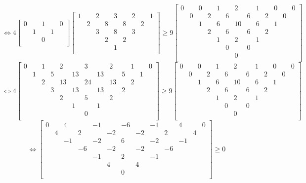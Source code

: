 \documentclass[UTF8]{ctexart}
\begin{document}
$$\Leftrightarrow 
4\left[
\begin{smallmatrix}
	0& &1& &0\\
	&1& &1&\\
	& &0& &\\
\end{smallmatrix}
\right]
\left[
\begin{smallmatrix}
	1& &2& &3& &2& &1\\
	&2& &8& &8& &2&\\
	& &3& &8& &3& &\\
	& & &2& &2& & &\\
	& & & &1& & & &\\
\end{smallmatrix}
\right]\geq 9
\left[
\begin{smallmatrix}
	0& &0& &1& &2& &1& &0& &0\\
	&0& &2& &6& &6& &2& &0&\\
	& &1& &6& &10& &6& &1& &\\
	& & &2& &6& &6& &2& & &\\
	& & & &1& &2& &1& & & &\\
	& & & & &0& &0& & & & &\\
	& & & & & &0& & & & & &\\
\end{smallmatrix}
\right]$$
$$\Leftrightarrow 
4\left[
\begin{smallmatrix}
	0& &1& &2& &3& &2& &1& &0\\
	&1& &5& &13& &13& &5& &1&\\
	& &2& &13& &24& &13& &2& &\\
	& & &3& &13& &13& &2& & &\\
	& & & &2& &5& &2& & & &\\
	& & & & &1& &1& & & & &\\
	& & & & & &0& & & & & &\\
\end{smallmatrix}
\right]\geq 9
\left[
\begin{smallmatrix}
	0& &0& &1& &2& &1& &0& &0\\
	&0& &2& &6& &6& &2& &0&\\
	& &1& &6& &10& &6& &1& &\\
	& & &2& &6& &6& &2& & &\\
	& & & &1& &2& &1& & & &\\
	& & & & &0& &0& & & & &\\
	& & & & & &0& & & & & &\\
\end{smallmatrix}
\right]
$$
$$\Leftrightarrow 
\left[
\begin{smallmatrix}
	0& &4& &-1& &-6& &-1& &4& &0\\
	&4& &2& &-2& &-2& &2& &4&\\
	& &-1& &-2& &6& &-2& &-1& &\\
	& & &-6& &-2& &-2& &-6& & &\\
	& & & &-1& &2& &-1& & & &\\
	& & & & &4& &4& & & & &\\
	& & & & & &0& & & & & &\\
\end{smallmatrix}
\right]\geq 0
$$ 
\end{document}
